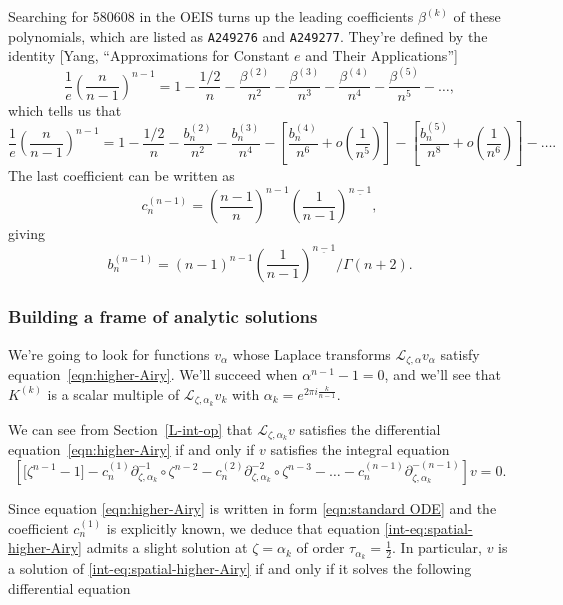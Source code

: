 \documentclass{article}
\newcommand{\laplace}{\mathcal{L}}
\begin{document}
Searching for 580608 in the OEIS turns up the leading coefficients $\beta^{(k)}$ of these polynomials, which are listed as {\tt A249276} and {\tt A249277}. They're defined by the identity [Yang, ``Approximations for Constant $e$ and Their Applications'']
\[ \frac{1}{e} \left(\frac{n}{n-1}\right)^{n-1} = 1 - \frac{1/2}{n} - \frac{\beta^{(2)}}{n^2} - \frac{\beta^{(3)}}{n^3} - \frac{\beta^{(4)}}{n^4} - \frac{\beta^{(5)}}{n^5} - \ldots, \]
which tells us that
\[ \frac{1}{e} \left(\frac{n}{n-1}\right)^{n-1} = 1 - \frac{1/2}{n} - \frac{b_n^{(2)}}{n^2} - \frac{b_n^{(3)}}{n^4} - \left[\frac{b_n^{(4)}}{n^6} + o\left(\frac{1}{n^5}\right)\right] - \left[\frac{b_n^{(5)}}{n^8} + o\left(\frac{1}{n^6}\right)\right] - \ldots. \]
The last coefficient can be written as
\[ c_n^{(n-1)} =\left(\frac{n-1}{n}\right)^{n-1} \left(\frac{1}{n-1}\right)^{\underline{n-1}}, 
\]
giving
\[ b_n^{(n-1)} = (n-1)^{n-1} \left(\frac{1}{n-1}\right)^{\underline{n-1}} \Big/ \Gamma(n+2). \]

\subsubsection{Building a frame of analytic solutions}

We're going to look for functions $v_\alpha$ whose Laplace transforms $\laplace_{\zeta, \alpha} v_\alpha$ satisfy equation~\eqref{eqn:higher-Airy}. We'll succeed when $\alpha^{n-1} - 1 = 0$, and we'll see that $K^{(k)}$ is a scalar multiple of $\laplace_{\zeta, \alpha_k} v_k$ with $\alpha_k=e^{2\pi i \tfrac{k}{n-1}}$.

We can see from Section~\ref{L-int-op} that $\laplace_{\zeta, \alpha_k} v$ satisfies the differential equation~\eqref{eqn:higher-Airy} if and only if $v$ satisfies the integral equation
\begin{equation}\label{int-eq:spatial-higher-Airy}
\left[ \big[ \zeta^{n-1} - 1 \big] - c_n^{(1)} \partial_{\zeta,\alpha_k}^{-1}\circ \zeta^{n-2} - c_n^{(2)} \partial_{\zeta,\alpha_k}^{-2} \circ\zeta^{n-3} - \ldots - c_n^{(n-1)} \partial_{\zeta,\alpha_k}^{-(n-1)} \right] v = 0.
\end{equation}

Since equation \eqref{eqn:higher-Airy} is written in form \eqref{eqn:standard ODE} and the coefficient $c_n^{(1)}$ is explicitly known, we deduce that equation \eqref{int-eq:spatial-higher-Airy} admits a slight solution at $\zeta={\alpha_k} $ of order $\tau_{\alpha_k}=\frac{1}{2}$. In particular, $v$ is a solution of \eqref{int-eq:spatial-higher-Airy} if and only if it solves the following differential equation
 
\end{document}
